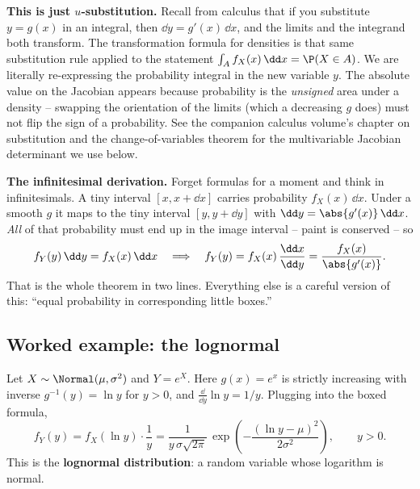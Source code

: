 \begin{connectionbox}
\textbf{This is just $u$-substitution.} Recall from calculus that if you substitute
$y = g(x)$ in an integral, then $\dd y = g'(x)\,\dd x$, and the limits and the integrand
both transform. The transformation formula for densities is that same substitution rule
applied to the statement $\int_A f_X(x)\,\dd x = \P(X \in A)$. We are literally
re-expressing the probability integral in the new variable $y$. The absolute value on the
Jacobian appears because probability is the \emph{unsigned} area under a density --
swapping the orientation of the limits (which a decreasing $g$ does) must not flip the sign
of a probability. See the companion calculus volume's chapter on substitution and the
change-of-variables theorem for the multivariable Jacobian determinant we use below.
\end{connectionbox}

\begin{whybox}
\textbf{The infinitesimal derivation.} Forget formulas for a moment and think in
infinitesimals. A tiny interval $[x, x+\dd x]$ carries probability $f_X(x)\,\dd x$. Under
a smooth $g$ it maps to the tiny interval $[y, y+\dd y]$ with $\dd y = \abs{g'(x)}\,\dd x$.
\emph{All} of that probability must end up in the image interval -- paint is conserved --
so
\[
  f_Y(y)\,\dd y = f_X(x)\,\dd x
  \quad\Longrightarrow\quad
  f_Y(y) = f_X(x)\,\frac{\dd x}{\dd y} = \frac{f_X(x)}{\abs{g'(x)}}.
\]
That is the whole theorem in two lines. Everything else is a careful version of this:
``equal probability in corresponding little boxes.''
\end{whybox}

\subsection{Worked example: the lognormal}

\begin{example}
\label{ch16:lognormal}
Let $X \sim \Normal(\mu,\sigma^2)$ and $Y = e^{X}$. Here $g(x) = e^x$ is strictly
increasing with inverse $g^{-1}(y) = \ln y$ for $y>0$, and $\tfrac{\dd}{\dd y}\ln y = 1/y$.
Plugging into the boxed formula,
\[
  f_Y(y) = f_X(\ln y)\cdot \frac{1}{y}
         = \frac{1}{y\,\sigma\sqrt{2\pi}}\,
           \exp\!\left(-\frac{(\ln y - \mu)^2}{2\sigma^2}\right), \qquad y>0.
\]
This is the \textbf{lognormal distribution}: a random variable whose logarithm is normal.
\end{example}

